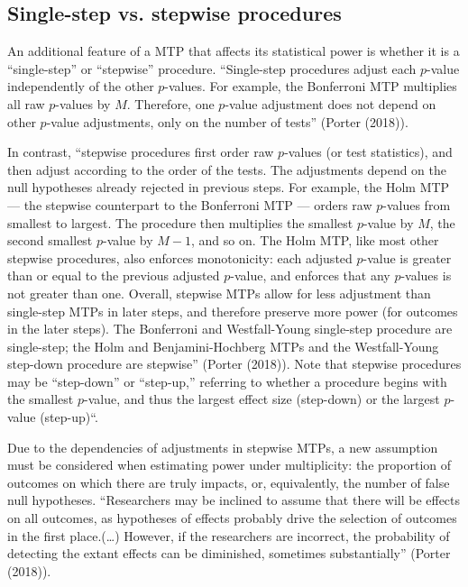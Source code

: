 \documentclass[
]{article}
\begin{document}
\subsection{Single-step vs. stepwise procedures}
\label{sec:stepwise}

An additional feature of a MTP that affects its statistical power is
whether it is a ``single-step'' or ``stepwise'' procedure. ``Single-step
procedures adjust each \(p\)-value independently of the other
\(p\)-values. For example, the Bonferroni MTP multiplies all raw
\(p\)-values by \(M\). Therefore, one \(p\)-value adjustment does not
depend on other \(p\)-value adjustments, only on the number of tests''
(Porter (2018)).

In contrast, ``stepwise procedures first order raw \(p\)-values (or test
statistics), and then adjust according to the order of the tests. The
adjustments depend on the null hypotheses already rejected in previous
steps. For example, the Holm MTP --- the stepwise counterpart to the
Bonferroni MTP --- orders raw \(p\)-values from smallest to largest. The
procedure then multiplies the smallest \(p\)-value by \(M\), the second
smallest \(p\)-value by \(M-1\), and so on. The Holm MTP, like most
other stepwise procedures, also enforces monotonicity: each adjusted
\(p\)-value is greater than or equal to the previous adjusted
\(p\)-value, and enforces that any \(p\)-values is not greater than one.
Overall, stepwise MTPs allow for less adjustment than single-step MTPs
in later steps, and therefore preserve more power (for outcomes in the
later steps). The Bonferroni and Westfall-Young single-step procedure
are single-step; the Holm and Benjamini-Hochberg MTPs and the
Westfall-Young step-down procedure are stepwise'' (Porter (2018)). Note
that stepwise procedures may be ``step-down'' or ``step-up,'' referring
to whether a procedure begins with the smallest \(p\)-value, and thus
the largest effect size (step-down) or the largest \(p\)-value
(step-up)``.

Due to the dependencies of adjustments in stepwise MTPs, a new
assumption must be considered when estimating power under multiplicity:
the proportion of outcomes on which there are truly impacts, or,
equivalently, the number of false null hypotheses. ``Researchers may be
inclined to assume that there will be effects on all outcomes, as
hypotheses of effects probably drive the selection of outcomes in the
first place.(\ldots) However, if the researchers are incorrect, the
probability of detecting the extant effects can be diminished, sometimes
substantially'' (Porter (2018)).
\end{document}
